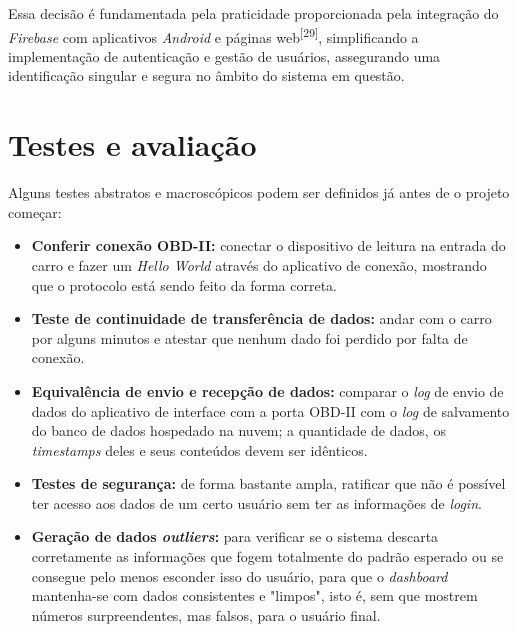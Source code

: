     Essa decisão é fundamentada pela praticidade proporcionada pela integração do \textit{Firebase} com aplicativos \textit{Android} e páginas web\textsuperscript{[29]}, simplificando a implementação de autenticação e gestão de usuários, assegurando uma identificação singular e segura no âmbito do sistema em questão.








\section{Testes e avaliação}
Alguns testes abstratos e macroscópicos podem ser definidos já antes de o projeto começar:

\begin{itemize}
    \item \textbf{Conferir conexão OBD-II:} conectar o dispositivo de leitura na entrada do carro e fazer um \textit{Hello World} através do aplicativo de conexão, mostrando que o protocolo está sendo feito da forma correta.
    
    \item \textbf{Teste de continuidade de transferência de dados:} andar com o carro por alguns minutos e atestar que nenhum dado foi perdido por falta de conexão.
    
    \item \textbf{Equivalência de envio e recepção de dados:} comparar o \textit{log} de envio de dados do aplicativo de interface com a porta OBD-II com o \textit{log} de salvamento do banco de dados hospedado na nuvem; a quantidade de dados, os \textit{timestamps} deles e seus conteúdos devem ser idênticos. 
    
    \item \textbf{Testes de segurança:} de forma bastante ampla, ratificar que não é possível ter acesso aos dados de um certo usuário sem ter as informações de \textit{login}.
    
    \item \textbf{Geração de dados \textit{outliers}:} para verificar se o sistema descarta corretamente as informações que fogem totalmente do padrão esperado ou se consegue pelo menos esconder isso do usuário, para que o \textit{dashboard} mantenha-se com dados consistentes e "limpos", isto é, sem que mostrem números surpreendentes, mas falsos, para o usuário final.
    
\end{itemize}

